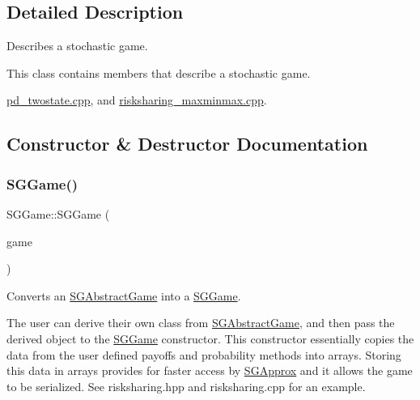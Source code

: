 \subsection{Detailed Description}
Describes a stochastic game. 

This class contains members that describe a stochastic game. \begin{Desc}
\item[Examples\+: ]\par
\hyperlink{pd_twostate_8cpp-example}{pd\+\_\+twostate.\+cpp}, and \hyperlink{risksharing_maxminmax_8cpp-example}{risksharing\+\_\+maxminmax.\+cpp}.\end{Desc}


\subsection{Constructor \& Destructor Documentation}
\mbox{\label{classSGGame_a0b85bb1b3a04539bef72dadc7e170b2f}} 
\subsubsection{\texorpdfstring{S\+G\+Game()}{SGGame()}\hspace{0.1cm}{\footnotesize\ttfamily [1/4]}}
{\footnotesize\ttfamily S\+G\+Game\+::\+S\+G\+Game (\begin{DoxyParamCaption}\item[{const \hyperlink{classSGAbstractGame}{S\+G\+Abstract\+Game} \&}]{game }\end{DoxyParamCaption})}



Converts an \hyperlink{classSGAbstractGame}{S\+G\+Abstract\+Game} into a \hyperlink{classSGGame}{S\+G\+Game}. 

The user can derive their own class from \hyperlink{classSGAbstractGame}{S\+G\+Abstract\+Game}, and then pass the derived object to the \hyperlink{classSGGame}{S\+G\+Game} constructor. This constructor essentially copies the data from the user defined payoffs and probability methods into arrays. Storing this data in arrays provides for faster access by \hyperlink{classSGApprox}{S\+G\+Approx} and it allows the game to be serialized. See risksharing.\+hpp and risksharing.\+cpp for an example. \mbox{\label{classSGGame_ad881fb3f3db38d4b7c2ea0beb7181fc0}} 
